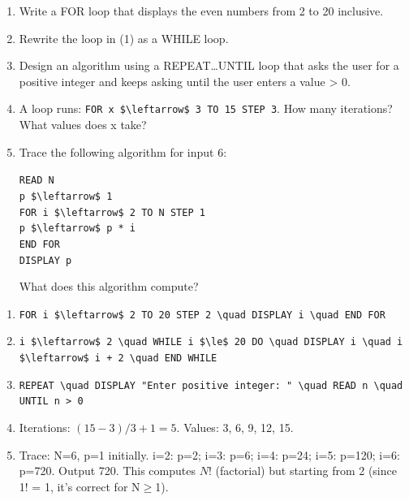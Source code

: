 \documentclass[11pt]{article}
\begin{document}
\begin{exercice}[Practice]
\begin{enumerate}
  \item Write a FOR loop that displays the even numbers from 2 to 20 inclusive.
  \item Rewrite the loop in (1) as a WHILE loop.
  \item Design an algorithm using a REPEAT…UNTIL loop that asks the user for a positive integer and keeps asking until the user enters a value > 0.
  \item A loop runs: \texttt{FOR x \$\textbackslash{}leftarrow\$ 3 TO 15 STEP 3}. How many iterations? What values does x take?
  \item Trace the following algorithm for input 6:
  \begin{flushleft}
  \texttt{READ N}\\
  \texttt{p \$\textbackslash{}leftarrow\$ 1}\\
  \texttt{FOR i \$\textbackslash{}leftarrow\$ 2 TO N STEP 1}\\
  \quad\texttt{p \$\textbackslash{}leftarrow\$ p * i}\\
  \texttt{END FOR}\\
  \texttt{DISPLAY p}
  \end{flushleft}
  What does this algorithm compute?
\end{enumerate}
\end{exercice}

\begin{corrige}[Exercise 1]
\begin{enumerate}
  \item \texttt{FOR i \$\textbackslash{}leftarrow\$ 2 TO 20 STEP 2 \textbackslash{}quad DISPLAY i \textbackslash{}quad END FOR}
  \item \texttt{i \$\textbackslash{}leftarrow\$ 2 \textbackslash{}quad WHILE i \$\textbackslash{}le\$ 20 DO \textbackslash{}quad DISPLAY i \textbackslash{}quad i \$\textbackslash{}leftarrow\$ i + 2 \textbackslash{}quad END WHILE}
  \item \texttt{REPEAT \textbackslash{}quad DISPLAY "Enter positive integer: " \textbackslash{}quad READ n \textbackslash{}quad UNTIL n > 0}
  \item Iterations: $(15-3)/3 + 1 = 5$. Values: 3, 6, 9, 12, 15.
  \item Trace: N=6, p=1 initially. i=2: p=2; i=3: p=6; i=4: p=24; i=5: p=120; i=6: p=720. Output 720. This computes $N!$ (factorial) but starting from 2 (since 1! = 1, it's correct for N$\ge$1).
\end{enumerate}
\end{corrige}
\end{document}
